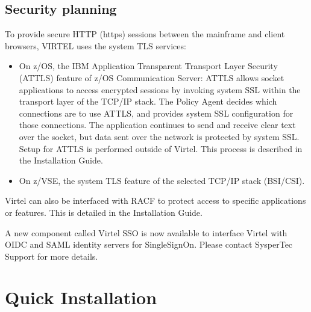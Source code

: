 \documentclass[letterpaper,10pt,english]{sphinxmanual}
\begin{document}
\section{Security planning}
\label{\detokenize{Getting_Started:security-planning}}
\sphinxAtStartPar
To provide secure HTTP (https) sessions between the mainframe and client browsers, VIRTEL uses the system TLS services:
\begin{itemize}
\item {} 
\sphinxAtStartPar
On z/OS, the IBM Application Transparent Transport Layer Security (AT\sphinxhyphen{}TLS) feature of z/OS Communication Server: AT\sphinxhyphen{}TLS allows socket applications to access encrypted sessions by invoking system SSL within the transport layer of the TCP/IP stack. The Policy Agent decides which connections are to use AT\sphinxhyphen{}TLS, and provides system SSL configuration for those connections. The application continues to send and receive clear text over the socket, but data sent over the network is protected by system SSL. Setup for AT\sphinxhyphen{}TLS is performed outside of Virtel. This process is described in the Installation Guide.

\item {} 
\sphinxAtStartPar
On z/VSE, the system TLS feature of the selected TCP/IP stack (BSI/CSI).

\end{itemize}

\sphinxAtStartPar
Virtel can also be interfaced with RACF to protect access to specific applications or features. This is detailed in the Installation Guide.

\sphinxAtStartPar
A new component called Virtel SSO is now available to interface Virtel with OIDC and SAML identity servers for Single\sphinxhyphen{}Sign\sphinxhyphen{}On. Please contact SysperTec Support for more details.


\chapter{Quick Installation}
\label{\detokenize{Getting_Started:quick-installation}}
\end{document}
